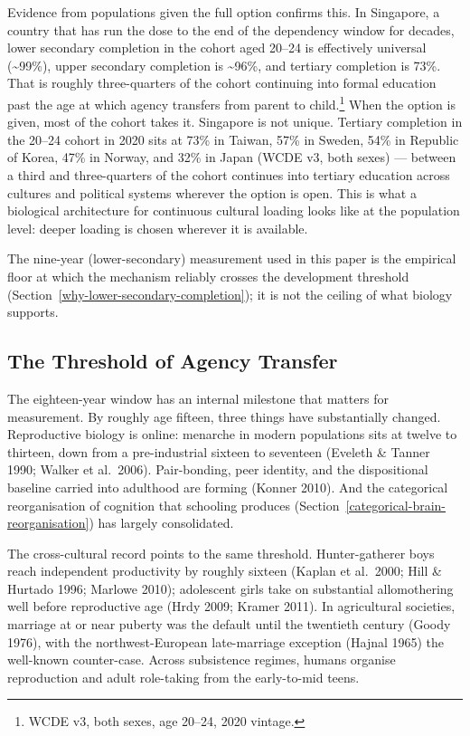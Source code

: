 \documentclass[12pt,letterpaper]{article}
\begin{document}
Evidence from populations given the full option confirms this. In
Singapore, a country that has run the dose to the end of the
dependency window for decades, lower secondary completion in the
cohort aged 20--24 is effectively universal (\textasciitilde 99\%),
upper secondary completion is \textasciitilde 96\%, and tertiary
completion is 73\%. That is roughly three-quarters of the cohort
continuing into formal education past the age at which agency
transfers from parent to child.\footnote{WCDE v3, both sexes, age
20--24, 2020 vintage.}
When the option is given, most of the cohort takes it. Singapore is
not unique. Tertiary completion in the 20--24 cohort in 2020 sits at
73\% in Taiwan, 57\% in Sweden, 54\% in Republic of Korea, 47\% in
Norway, and 32\% in Japan (WCDE v3, both sexes) ---
between a third and three-quarters of the cohort continues into
tertiary education across cultures and political systems wherever the
option is open. This is what a biological architecture for continuous
cultural loading looks like at the population level: deeper loading
is chosen wherever it is available.

The nine-year (lower-secondary) measurement used in this paper is
the empirical floor at which the mechanism reliably crosses the
development threshold (Section~\ref{why-lower-secondary-completion}); it is
not the ceiling of what biology supports.

\subsection{The Threshold of Agency Transfer}\label{the-threshold-of-agency-transfer}

The eighteen-year window has an internal milestone that matters for
measurement. By roughly age fifteen, three things have substantially
changed. Reproductive biology is online: menarche in modern
populations sits at twelve to thirteen, down from a pre-industrial
sixteen to seventeen (Eveleth \& Tanner 1990; Walker et al.~2006).
Pair-bonding, peer identity, and the dispositional baseline carried
into adulthood are forming (Konner 2010). And the categorical
reorganisation of cognition that schooling produces
(Section~\ref{categorical-brain-reorganisation}) has largely
consolidated.

The cross-cultural record points to the same threshold. Hunter-gatherer
boys reach independent productivity by roughly sixteen (Kaplan et
al.~2000; Hill \& Hurtado 1996; Marlowe 2010); adolescent girls take
on substantial allomothering well before reproductive age (Hrdy 2009;
Kramer 2011). In agricultural societies, marriage at or near puberty
was the default until the twentieth century (Goody 1976), with the
northwest-European late-marriage exception (Hajnal 1965) the
well-known counter-case. Across subsistence regimes, humans organise
reproduction and adult role-taking from the early-to-mid teens.
\end{document}
